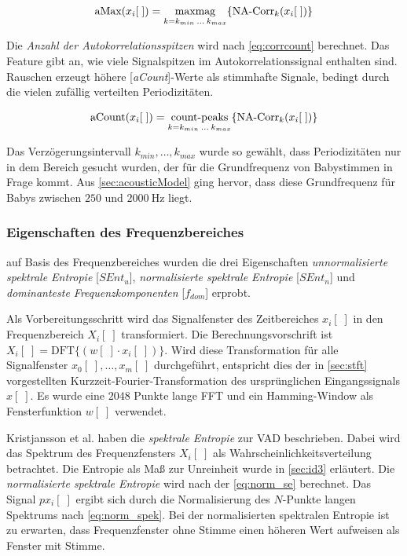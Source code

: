 \begin{equation}
\text{aMax}(x_i[\;]) = \operatorname*{max mag}_{k = k_{min} \: \ldots \: k_{max}}\{\text{NA-Corr}_k(x_i[\;])\}
\label{eq:corrpeak}
\end{equation}

Die \emph{Anzahl der Autokorrelationsspitzen} wird nach \autoref{eq:corrcount} berechnet. Das Feature gibt an, wie viele Signalspitzen im Autokorrelationssignal enthalten sind. Rauschen erzeugt höhere [\emph{aCount}]-Werte als stimmhafte Signale, bedingt durch die vielen zufällig verteilten Periodizitäten.\cite[S. 1 - 2]{vad_Lisboa}

\begin{equation}
\text{aCount}(x_i[\;]) = \operatorname*{count-peaks}_{k = k_{min} \: \ldots \: k_{max}}\{\text{NA-Corr}_k(x_i[\;])\}
\label{eq:corrcount}
\end{equation}

Das Verzögerungsintervall $k_{min} , \ldots , k_{max}$ wurde so gewählt, dass Periodizitäten nur in dem Bereich gesucht wurden, der für die Grundfrequenz von Babystimmen in Frage kommt. Aus \autoref{sec:acousticModel} ging hervor, dass diese Grundfrequenz für Babys zwischen $250$ und $\SI{2000}{\hertz}$ liegt.

\subsubsection{Eigenschaften des Frequenzbereiches}

auf Basis des Frequenzbereiches wurden die drei Eigenschaften \emph{unnormalisierte spektrale Entropie} [$SEnt_{u}$], \emph{normalisierte spektrale Entropie}  [$SEnt_{n}$] und \emph{dominanteste Frequenzkomponenten} [$f_{dom}$] erprobt.\cite{vad_Lisboa}

Als Vorbereitungsschritt wird das Signalfenster des Zeitbereiches $x_i[\;]$ in den Frequenzbereich $X_i[\;]$ transformiert. Die Berechnungsvorschrift ist $X_i[\;] = \text{DFT}\{(w[\;] \cdot x_i[\;])\}$. Wird diese Transformation für alle Signalfenster $x_0[\;], \ldots, x_m[\;]$ durchgeführt, entspricht dies der in \autoref{sec:stft} vorgestellten Kurzzeit-Fourier-Transformation des ursprünglichen Eingangssignals $x[\;]$. Es wurde eine $2048$ Punkte lange FFT und ein Hamming-Window als Fensterfunktion $w[\;]$ verwendet.

Kristjansson et al. \cite[S. 2]{vad_Lisboa} haben die \emph{spektrale Entropie} zur VAD beschrieben. Dabei wird das Spektrum des Frequenzfensters $X_i[\;]$ als Wahrscheinlichkeitsverteilung betrachtet. Die Entropie als Maß zur \glqq Unreinheit\grqq{} wurde in \autoref{sec:id3} erläutert. Die \emph{normalisierte spektrale Entropie} wird nach der \autoref{eq:norm_se} berechnet. Das Signal $px_i[\;]$ ergibt sich durch die Normalisierung des $N$-Punkte langen Spektrums nach \autoref{eq:norm_spek}. Bei der normalisierten spektralen Entropie ist zu erwarten, dass Frequenzfenster ohne Stimme einen höheren Wert aufweisen als Fenster mit Stimme.\cite[S. 2]{vad_Lisboa} 


